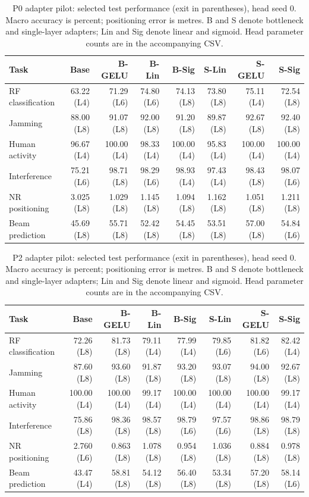 \begin{table}[t]
\centering
\caption{P0 adapter pilot: selected test performance (exit in parentheses), head seed 0. Macro accuracy is percent; positioning error is metres. B and S denote bottleneck and single-layer adapters; Lin and Sig denote linear and sigmoid. Head parameter counts are in the accompanying CSV.}
\begingroup\small\setlength{\tabcolsep}{2pt}
\begin{tabular}{lrrrrrrr}
\hline
Task & Base & B-GELU & B-Lin & B-Sig & S-Lin & S-GELU & S-Sig \\
\hline
RF classification & 63.22 (L4) & 71.29 (L6) & 74.80 (L6) & 74.13 (L8) & 73.80 (L8) & 75.11 (L4) & 72.54 (L8) \\
Jamming & 88.00 (L8) & 91.07 (L8) & 92.00 (L8) & 91.20 (L8) & 89.87 (L8) & 92.67 (L8) & 92.40 (L8) \\
Human activity & 96.67 (L4) & 100.00 (L4) & 98.33 (L4) & 100.00 (L4) & 95.83 (L4) & 100.00 (L4) & 100.00 (L4) \\
Interference & 75.21 (L6) & 98.71 (L8) & 98.29 (L6) & 98.93 (L4) & 97.43 (L4) & 98.43 (L8) & 98.07 (L6) \\
NR positioning & 3.025 (L8) & 1.029 (L8) & 1.145 (L8) & 1.094 (L8) & 1.162 (L8) & 1.051 (L8) & 1.211 (L8) \\
Beam prediction & 45.69 (L8) & 55.71 (L8) & 52.42 (L8) & 54.45 (L8) & 53.51 (L8) & 57.00 (L8) & 54.84 (L6) \\
\hline
\end{tabular}
\endgroup
\end{table}

\begin{table}[t]
\centering
\caption{P2 adapter pilot: selected test performance (exit in parentheses), head seed 0. Macro accuracy is percent; positioning error is metres. B and S denote bottleneck and single-layer adapters; Lin and Sig denote linear and sigmoid. Head parameter counts are in the accompanying CSV.}
\begingroup\small\setlength{\tabcolsep}{2pt}
\begin{tabular}{lrrrrrrr}
\hline
Task & Base & B-GELU & B-Lin & B-Sig & S-Lin & S-GELU & S-Sig \\
\hline
RF classification & 72.26 (L8) & 81.73 (L8) & 79.11 (L4) & 77.99 (L4) & 79.85 (L6) & 81.82 (L6) & 82.42 (L4) \\
Jamming & 87.60 (L8) & 93.60 (L8) & 91.87 (L8) & 93.20 (L8) & 93.07 (L8) & 94.00 (L8) & 92.67 (L8) \\
Human activity & 100.00 (L4) & 100.00 (L4) & 99.17 (L4) & 100.00 (L4) & 100.00 (L4) & 100.00 (L4) & 99.17 (L4) \\
Interference & 75.86 (L8) & 98.36 (L8) & 98.57 (L8) & 98.79 (L6) & 97.57 (L6) & 98.86 (L8) & 98.79 (L8) \\
NR positioning & 2.760 (L6) & 0.863 (L8) & 1.078 (L8) & 0.954 (L8) & 1.036 (L8) & 0.884 (L8) & 0.978 (L8) \\
Beam prediction & 43.47 (L4) & 58.81 (L8) & 54.12 (L8) & 56.40 (L8) & 53.34 (L8) & 57.20 (L8) & 58.14 (L6) \\
\hline
\end{tabular}
\endgroup
\end{table}
